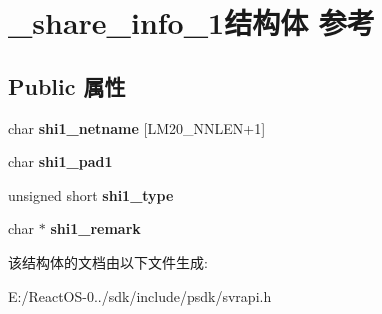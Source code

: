 \hypertarget{struct__share__info__1}{}\section{\+\_\+share\+\_\+info\+\_\+1结构体 参考}
\label{struct__share__info__1}
\subsection*{Public 属性}
\begin{DoxyCompactItemize}
\item 
\mbox{\label{struct__share__info__1_ac3a1931592af0cba1beb81d08aa8aa9a}} 
char {\bfseries shi1\+\_\+netname} \mbox{[}L\+M20\+\_\+\+N\+N\+L\+EN+1\mbox{]}
\item 
\mbox{\label{struct__share__info__1_adf62fe5ab58d6cec4c89c6bba9557727}} 
char {\bfseries shi1\+\_\+pad1}
\item 
\mbox{\label{struct__share__info__1_a6c02aa739a2bd0bebe674880d8679ff8}} 
unsigned short {\bfseries shi1\+\_\+type}
\item 
\mbox{\label{struct__share__info__1_a368c05fbf6c124d9517ab9ba0cc7b462}} 
char $\ast$ {\bfseries shi1\+\_\+remark}
\end{DoxyCompactItemize}


该结构体的文档由以下文件生成\+:\begin{DoxyCompactItemize}
\item 
E\+:/\+React\+O\+S-\/0../sdk/include/psdk/svrapi.\+h\end{DoxyCompactItemize}

